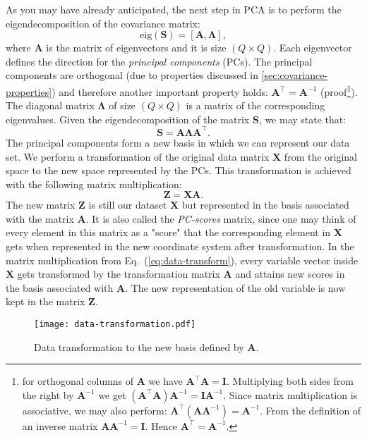 \documentclass[10pt,twocolumn]{article}
\begin{document}
As you may have already anticipated, the next step in PCA is to perform the eigendecomposition of the covariance matrix:
\begin{equation} \label{eq:eig-dec}
\text{eig}(\mathbf{S}) = [\mathbf{A}, \mathbf{\Lambda}],
\end{equation}
where $\mathbf{A}$ is the matrix of eigenvectors and it is size $(Q \times Q)$. Each eigenvector defines the direction for the \textit{principal components} (PCs). The principal components are orthogonal (due to properties discussed in \ref{sec:covariance-properties}) and therefore another important property holds: $\mathbf{A}^{\top} = \mathbf{A}^{-1}$ (proof\footnote{for orthogonal columns of $\mathbf{A}$ we have $\mathbf{A}^{\top} \mathbf{A} = \mathbf{I}$. Multiplying both sides from the right by $ \mathbf{A}^{-1}$ we get $(\mathbf{A}^{\top} \mathbf{A}) \mathbf{A}^{-1}= \mathbf{I}\mathbf{A}^{-1}$. Since matrix multiplication is associative, we may also perform: $\mathbf{A}^{\top} (\mathbf{A} \mathbf{A}^{-1}) = \mathbf{A}^{-1}$. From the definition of an inverse matrix $\mathbf{A} \mathbf{A}^{-1} = \mathbf{I}$. Hence $\mathbf{A}^{\top} = \mathbf{A}^{-1}$.}).
The diagonal matrix $\mathbf{\Lambda}$ of size $(Q \times Q)$ is a matrix of the corresponding eigenvalues. Given the eigendecomposition of the matrix $\mathbf{S}$, we may state that: 
\begin{equation} \label{eq:eig-dec-cov-matrix}
\mathbf{S} = \mathbf{A} \mathbf{\Lambda} \mathbf{A}^{\top}.
\end{equation}
The principal components form a new basis in which we can represent our data set. We perform a transformation of the original data matrix $\mathbf{X}$ from the original space to the new space represented by the PCs. This transformation is achieved with the following matrix multiplication:
\begin{equation} \label{eq:data-transform}
\mathbf{Z} = \mathbf{X} \mathbf{A}.
\end{equation}
The new matrix $\mathbf{Z}$ is still our dataset $\mathbf{X}$ but represented in the basis associated with the matrix $\mathbf{A}$. It is also called the \textit{PC-scores} matrix, since one may think of every element in this matrix as a "score" that the corresponding element in $\mathbf{X}$ gets when represented in the new coordinate system after transformation. In the matrix multiplication from Eq.~(\ref{eq:data-transform}), every variable vector inside $\mathbf{X}$ gets transformed by the transformation matrix $\mathbf{A}$ and attains new scores in the basis associated with $\mathbf{A}$. The new representation of the old variable is now kept in the matrix $\mathbf{Z}$.
\begin{figure}[t]
\centering\texttt{[image: data-transformation.pdf]}
\caption{Data transformation to the new basis defined by $\mathbf{A}$.}
\label{fig:data-transformation}
\end{figure}
\end{document}
